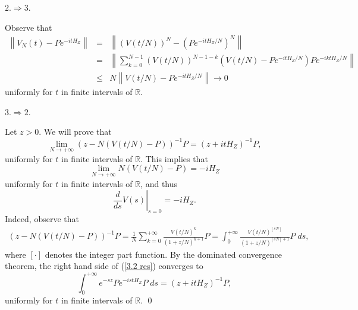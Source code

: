 \documentclass[aip,jmp
]{revtex4}
\newcommand{\RM}{\mathbb{R}}
\theoremstyle{definition}
\begin{document}
$2. \Rightarrow 3.$

Observe that
\begin{eqnarray*}
\left\|V_{N}(t)-Pe^{-itH_{Z}}\right\| & = & \left\|\left(V(t/N)\right)^N-(Pe^{-itH_{Z}/N})^N\right\| \\
                                      & = & \left\| \sum_{k=0}^{N-1} (V(t/N))^{N-1-k} (V(t/N)-Pe^{-itH_{Z}/N})Pe^{-iktH_{Z}/N} \right\| \\
                                      & \leq & N \left\|V(t/N)-Pe^{-itH_{Z}/N}\right\| \to 0
\end{eqnarray*}
uniformly for $t$ in finite intervals of $\RM$.

$3. \Rightarrow 2.$

Let $z>0$. We will prove that
$$
\lim_{N \to +\infty}\left( z-N \left(V(t/N)-P\right)\right)^{-1}P =(z+itH_{Z})^{-1}P,
$$
uniformly for $t$ in finite intervals of $\RM$. This implies that
$$
\lim_{N \to +\infty} N(V(t/N)-P) = -iH_{Z}
$$
uniformly for $t$ in finite intervals of $\RM$, and thus
$$
\left.\frac{d}{ds}V(s)\right|_{s=0}=-iH_{Z}.
$$
Indeed, observe that
\begin{eqnarray}\label{3.2 res}
\left( z-N\left(V(t/N)-P\right)\right)^{-1}P  =  \frac{1}{N}\sum_{k=0}^{+\infty}\frac{V(t/N)^k}{(1+z/N)^{k+1}}P  =  \int_{0}^{+\infty}\frac{V(t/N)^{[sN]}}{(1+z/N)^{[sN]+1}} P \; ds ,
\end{eqnarray}
where $[\cdot]$ denotes the integer part function.
By the dominated convergence theorem, the right hand side of (\ref{3.2 res}) converges to
$$
\int_{0}^{+\infty} e^{-sz} Pe^{-istH_{Z}}P \;  ds = (z+itH_{Z})^{-1}P,
$$
uniformly for $t$ in finite intervals of $\RM$.
\qed
\end{document}
